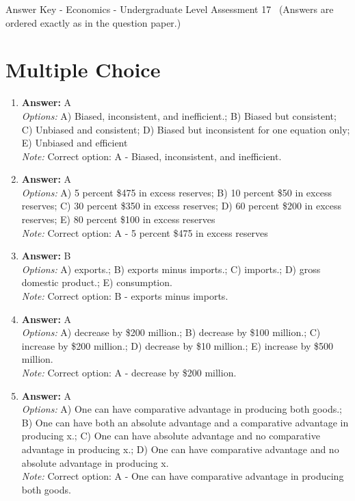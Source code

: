 \documentclass[12pt]{article}
\begin{document}
\begin{center}
Answer Key - Economics - Undergraduate Level Assessment 17 \
\small (Answers are ordered exactly as in the question paper.)
\end{center}

\section*{Multiple Choice}
\begin{enumerate}[label=\arabic*.]
\item \textbf{Answer:} A
\\ \textit{Options:} A) Biased, inconsistent, and inefficient.; B) Biased but consistent; C) Unbiased and consistent; D) Biased but inconsistent for one equation only; E) Unbiased and efficient
\\ \textit{Note:} Correct option: A - Biased, inconsistent, and inefficient.
\item \textbf{Answer:} A
\\ \textit{Options:} A) 5 percent \$475 in excess reserves; B) 10 percent \$50 in excess reserves; C) 30 percent \$350 in excess reserves; D) 60 percent \$200 in excess reserves; E) 80 percent \$100 in excess reserves
\\ \textit{Note:} Correct option: A - 5 percent \$475 in excess reserves
\item \textbf{Answer:} B
\\ \textit{Options:} A) exports.; B) exports minus imports.; C) imports.; D) gross domestic product.; E) consumption.
\\ \textit{Note:} Correct option: B - exports minus imports.
\item \textbf{Answer:} A
\\ \textit{Options:} A) decrease by \$200 million.; B) decrease by \$100 million.; C) increase by \$200 million.; D) decrease by \$10 million.; E) increase by \$500 million.
\\ \textit{Note:} Correct option: A - decrease by \$200 million.
\item \textbf{Answer:} A
\\ \textit{Options:} A) One can have comparative advantage in producing both goods.; B) One can have both an absolute advantage and a comparative advantage in producing x.; C) One can have absolute advantage and no comparative advantage in producing x.; D) One can have comparative advantage and no absolute advantage in producing x.
\\ \textit{Note:} Correct option: A - One can have comparative advantage in producing both goods.
\end{enumerate}
\end{document}
